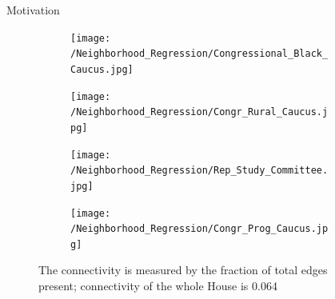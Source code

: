 \documentclass[final]{beamer}
\newlength{\sepwid}
\newlength{\onecolwid}
\begin{document}
\begin{frame}[t]
\begin{columns}[t]
\begin{column}{\onecolwid}
\begin{block}{Motivation}
\begin{figure}[h]
  \centering
    \begin{subfigure}[b]{0.49\textwidth}
        \texttt{[image: /Neighborhood\_Regression/Congressional\_Black\_Caucus.jpg]}
    \end{subfigure}
          \begin{subfigure}[b]{0.49\textwidth}
        \texttt{[image: /Neighborhood\_Regression/Congr\_Rural\_Caucus.jpg]}
    \end{subfigure}
        \begin{subfigure}[b]{0.49\textwidth}
        \texttt{[image: /Neighborhood\_Regression/Rep\_Study\_Committee.jpg]}
    \end{subfigure}
          \begin{subfigure}[b]{0.49\textwidth}
        \texttt{[image: /Neighborhood\_Regression/Congr\_Prog\_Caucus.jpg]}
    \end{subfigure}
\caption{{\selectfont 
The connectivity is measured by the fraction of total edges present; connectivity of the whole House is 0.064}}
\end{figure}

\end{block}




\end{column} %

\begin{column}{\sepwid}\end{column} %


\end{columns}
\end{frame}
\end{document}
